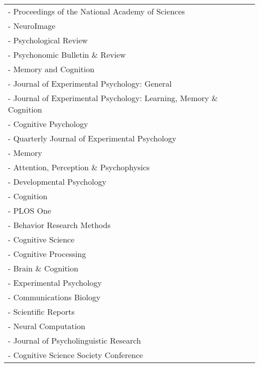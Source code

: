\documentclass[letterpaper]{article}
\begin{document}
\begin{longtable}{p{14cm}p{0cm}}
- Proceedings of the National Academy of Sciences \\
- NeuroImage \\
- Psychological Review \\
- Psychonomic Bulletin \& Review \\
- Memory and Cognition \\
- Journal of Experimental Psychology: General \\
- Journal of Experimental Psychology: Learning, Memory \& Cognition \\
- Cognitive Psychology\\
- Quarterly Journal of Experimental Psychology \\
- Memory \\
- Attention, Perception \& Psychophysics \\
- Developmental Psychology \\
- Cognition \\
- PLOS One \\
- Behavior Research Methods \\
- Cognitive Science \\
- Cognitive Processing \\
- Brain \& Cognition \\
- Experimental Psychology \\
- Communications Biology \\
- Scientific Reports \\
- Neural Computation \\
- Journal of Psycholinguistic Research\\
- Cognitive Science Society Conference\\
\end{longtable}
\end{document}
